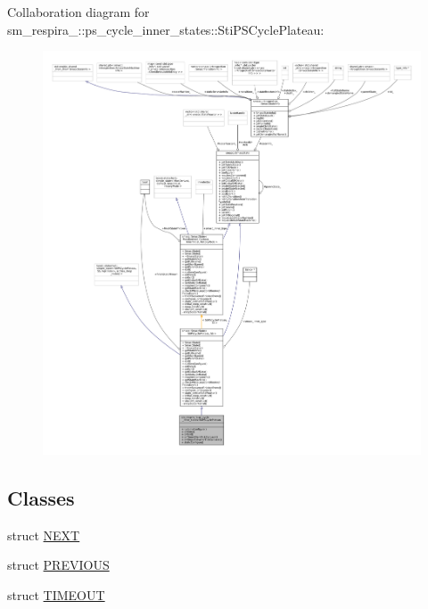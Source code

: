 Collaboration diagram for sm\+\_\+respira\+\_\+:\+:ps\+\_\+cycle\+\_\+inner\+\_\+states\+:\+:Sti\+P\+S\+Cycle\+Plateau\+:
\nopagebreak
\begin{figure}[H]
\begin{center}
\leavevmode
\includegraphics[width=350pt]{structsm__respira__1_1_1ps__cycle__inner__states_1_1StiPSCyclePlateau__coll__graph}
\end{center}
\end{figure}
\subsection*{Classes}
\begin{DoxyCompactItemize}
\item 
struct \hyperlink{structsm__respira__1_1_1ps__cycle__inner__states_1_1StiPSCyclePlateau_1_1NEXT}{N\+E\+XT}
\item 
struct \hyperlink{structsm__respira__1_1_1ps__cycle__inner__states_1_1StiPSCyclePlateau_1_1PREVIOUS}{P\+R\+E\+V\+I\+O\+US}
\item 
struct \hyperlink{structsm__respira__1_1_1ps__cycle__inner__states_1_1StiPSCyclePlateau_1_1TIMEOUT}{T\+I\+M\+E\+O\+UT}
\end{DoxyCompactItemize}
